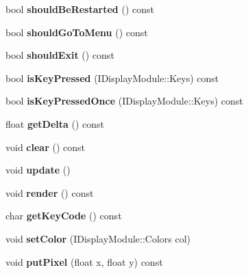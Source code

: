 \begin{DoxyCompactItemize}
bool {\bfseries should\+Be\+Restarted} () const
\item 
\mbox{\label{class_sfml_module_a3adb5876faae3f5252f72aebca011c65}} 
bool {\bfseries should\+Go\+To\+Menu} () const
\item 
\mbox{\label{class_sfml_module_a1a2337bf4a8b00fba3c64ff64446a723}} 
bool {\bfseries should\+Exit} () const
\item 
\mbox{\label{class_sfml_module_a6c555d93ecceef43111e6b288a2c0666}} 
bool {\bfseries is\+Key\+Pressed} (I\+Display\+Module\+::\+Keys) const
\item 
\mbox{\label{class_sfml_module_a6ddaf09ec24ffee6667eb03a46bfba86}} 
bool {\bfseries is\+Key\+Pressed\+Once} (I\+Display\+Module\+::\+Keys) const
\item 
\mbox{\label{class_sfml_module_a45e7ee1f3b58eec98a1939006381200a}} 
float {\bfseries get\+Delta} () const
\item 
\mbox{\label{class_sfml_module_a67804ab29b7c03a680e300fcc6c78ad4}} 
void {\bfseries clear} () const
\item 
\mbox{\label{class_sfml_module_a8fae81e79ba8bd480c916fb6f5dede98}} 
void {\bfseries update} ()
\item 
\mbox{\label{class_sfml_module_a5f01136acb23568442b690b13b5e0b78}} 
void {\bfseries render} () const
\item 
\mbox{\label{class_sfml_module_a1722f82cf8a36375d7cf6496db7b6f05}} 
char {\bfseries get\+Key\+Code} () const
\item 
\mbox{\label{class_sfml_module_abded5b03437a889cf9310e95462a16ad}} 
void {\bfseries set\+Color} (I\+Display\+Module\+::\+Colors col)
\item 
\mbox{\label{class_sfml_module_ab34bf75bd964b0b13c855a7bda40b1f8}} 
void {\bfseries put\+Pixel} (float x, float y) const
\item 
\mbox{\label{class_sfml_module_ae4ca531f5f9c69d859689fef8ffc6f02}} 

\end{DoxyCompactItemize}
